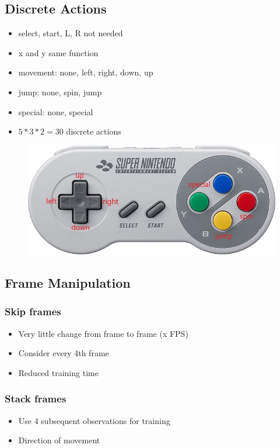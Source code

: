 \documentclass{article}
\begin{document}
    \subsection{Discrete Actions}
    \begin{itemize}
        \item select, start, L, R not needed
        \item x and y same function
        \item movement: none, left, right, down, up
        \item jump: none, spin, jump
        \item special: none, special
        \item $5*3*2=30$ discrete actions
    \end{itemize}
    \begin{figure}[H]
    \centering
    \includegraphics[width=.85\textwidth]{snes-controller-annot}
    \end{figure}
    \subsection{Frame Manipulation}
    \subsubsection*{Skip frames}
    \begin{itemize}
        \item Very little change from frame to frame (x FPS)
        \item Consider every 4th frame
        \item Reduced training time
    \end{itemize}
    \subsubsection*{Stack frames}
    \begin{itemize}
        \item Use 4 subsequent observations for training
        \item Direction of movement
    \end{itemize}
\end{document}
